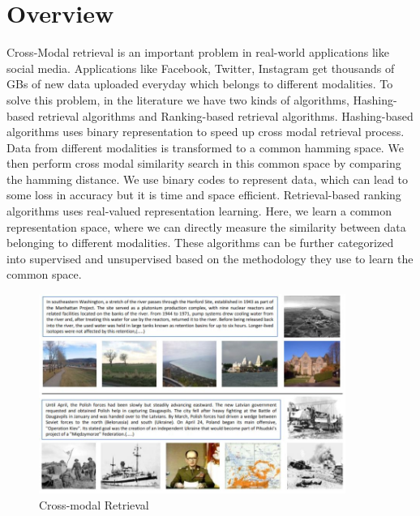 \documentclass[10pt]{scrartcl}
\begin{document}
\section{Overview}
Cross-Modal retrieval is an important problem in real-world applications like social media. Applications like Facebook, Twitter, Instagram get thousands of GBs of new data uploaded everyday which belongs to different modalities. To solve this problem, in the literature we have two kinds of algorithms, Hashing-based retrieval algorithms and Ranking-based retrieval algorithms.
Hashing-based algorithms uses binary representation to speed up cross modal retrieval process. Data from different modalities is transformed to a common hamming  space. We then perform cross modal similarity search in this common space by comparing the hamming distance. We use binary codes to represent data, which can lead to some loss in accuracy but it is time and space efficient.
Retrieval-based ranking algorithms uses real-valued representation learning. Here, we learn a common representation space, where we can directly measure the similarity between data belonging to different modalities. These algorithms can be further categorized into supervised and unsupervised based on the methodology they use to learn the common space.
\begin{figure}
    \centering
    \includegraphics[width=10cm]{example2.JPG}
    \caption{Cross-modal Retrieval}
    \label{fig:example}
\end{figure}
\end{document}
